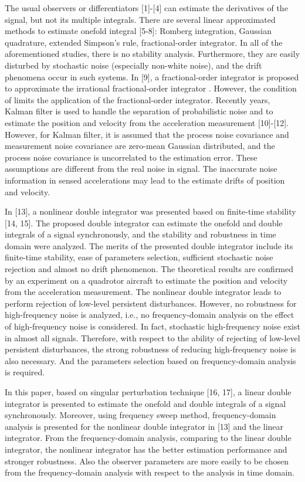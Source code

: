 \documentclass[10pt,journal]{IEEEtran}
\begin{document}
The usual observers or differentiators [1]-[4] can estimate the derivatives
of the signal, but not its multiple integrals. There are several linear
approximated methods to estimate onefold integral [5-8]: Romberg
integration, Gaussian quadrature, extended Simpson's rule, fractional-order
integrator. In all of the aforementioned studies, there is no stability
analysis. Furthermore, they are easily disturbed by stochastic noise
(especially non-white noise), and the drift phenomena occur in such systems.
In [9], a fractional-order integrator is proposed to approximate the
irrational fractional-order integrator . However, the condition of  limits the application of the fractional-order integrator. Recently
years, Kalman filter is used to handle the separation of probabilistic noise
and to estimate the position and velocity from the acceleration measurement
[10]-[12]. However, for Kalman filter, it is assumed that the process noise
covariance and measurement noise covariance are zero-mean Gaussian
distributed, and the process noise covariance is uncorrelated to the
estimation error. These assumptions are different from the real noise in
signal. The inaccurate noise information in sensed accelerations may lead to
the estimate drifts of position and velocity.

In [13], a nonlinear double integrator was presented based on finite-time
stability [14, 15]. The proposed double integrator can estimate the onefold
and double integrals of a signal synchronously, and the stability and
robustness in time domain were analyzed. The merits of the presented double
integrator include its finite-time stability, ease of parameters selection,
sufficient stochastic noise rejection and almost no drift phenomenon. The
theoretical results are confirmed by an experiment on a quadrotor aircraft
to estimate the position and velocity from the acceleration measurement. The
nonlinear double integrator leads to perform rejection of low-level
persistent disturbances. However, no robustness for high-frequency noise is
analyzed, i.e., no frequency-domain analysis on the effect of high-frequency
noise is considered. In fact, stochastic high-frequency noise exist in
almost all signals. Therefore, with respect to the ability of rejecting of
low-level persistent disturbances, the strong robustness of reducing
high-frequency noise is also necessary. And the parameters selection based
on frequency-domain analysis is required.

In this paper, based on singular perturbation technique [16, 17], a linear
double integrator is presented to estimate the onefold and double integrals
of a signal synchronously. Moreover, using frequency sweep method,
frequency-domain analysis is presented for the nonlinear double integrator
in [13] and the linear integrator. From the frequency-domain analysis,
comparing to the linear double integrator, the nonlinear integrator has the
better estimation performance and stronger robustness. Also the observer
parameters are more easily to be chosen from the frequency-domain analysis
with respect to the analysis in time domain.
\end{document}
